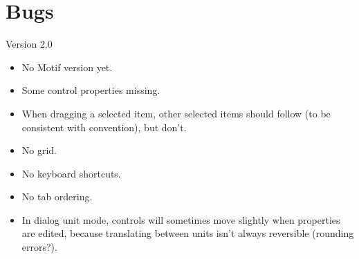\chapter{Bugs}\label{bugs}
%
\setfooter{\thepage}{}{}{}{}{\thepage}%

Version 2.0

\begin{itemize}\itemsep=0pt
\item No Motif version yet.
\item Some control properties missing.
\item When dragging a selected item, other selected items should follow (to be
consistent with convention), but don't.
\item No grid.
\item No keyboard shortcuts.
\item No tab ordering.
\item In dialog unit mode, controls will sometimes move slightly when properties are edited,
because translating between units isn't always reversible (rounding errors?).
\end{itemize}
